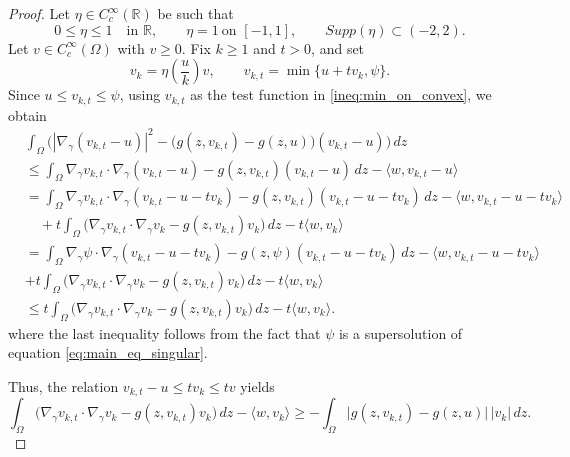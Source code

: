 \documentclass[11pt]{article}
\newcommand{\gradgr}{\nabla_{\gamma}}
\begin{document}
\begin{proof}
Let $\eta \in C_c^\infty(\mathbb{R})$ be such that
\begin{equation*}
0 \le \eta \le 1 \quad \text{in } \mathbb{R}, \qquad
\eta = 1 \ \text{on } [-1,1], \qquad
Supp(\eta) \subset (-2,2).
\end{equation*}
Let $v \in C_c^\infty(\Omega)$ with $v \ge 0$. Fix $k \ge 1$ and $t > 0$, and set
\begin{equation*}
v_k = \eta\!\left( \frac{u}{k} \right) v,
\qquad
v_{k,t} = \min \{ u + t v_k , \psi \}.
\end{equation*}
Since $u \le v_{k,t} \le \psi$, using $v_{k,t}$ as the test function in \eqref{ineq:min_on_convex}, we obtain
\begin{align*}
&\int_\Omega
\Big(
|\gradgr (v_{k,t}-u)|^2
-
\big( g(z,v_{k,t}) - g(z,u) \big)
(v_{k,t}-u)
\Big)\,dz
 \\ &
\le
\int_\Omega
\gradgr v_{k,t} \cdot \gradgr (v_{k,t}-u)
-
g(z,v_{k,t})(v_{k,t}-u)\,dz
-
\langle w , v_{k,t}-u \rangle
\\ & =
\int_\Omega
\gradgr v_{k,t} \cdot \gradgr (v_{k,t}-u-t v_k)
-
g(z,v_{k,t})(v_{k,t}-u-t v_k)\,dz
-
\langle w , v_{k,t}-u-t v_k \rangle
\\
&\quad
+ t \int_\Omega
\big(
\gradgr v_{k,t} \cdot \gradgr v_k
-
g(z,v_{k,t}) v_k
\big)\,dz
-
t \langle w , v_k \rangle \\
& =
\int_\Omega
\gradgr \psi \cdot \gradgr (v_{k,t}-u-t v_k)
-
g(z,\psi)(v_{k,t}-u-t v_k)\,dz
-
\langle w , v_{k,t}-u-t v_k \rangle
\\
&+ t \int_\Omega
\big(
\gradgr v_{k,t} \cdot \gradgr v_k
-
g(z,v_{k,t}) v_k
\big)\,dz
-
t \langle w , v_k \rangle 
\\& \leq 
t \int_\Omega
\big(
\gradgr v_{k,t} \cdot \gradgr v_k
-
g(z,v_{k,t}) v_k
\big)\,dz
-
t \langle w , v_k \rangle.
\end{align*}
where the last inequality follows from the fact that $\psi$ is a supersolution of equation \eqref{eq:main_eq_singular}.

Thus, the relation $v_{k,t} - u \le t v_k \le t v$ yields
\begin{equation*}
\int_\Omega
\big(
\gradgr v_{k,t} \cdot \gradgr v_k
-
g(z,v_{k,t}) v_k
\big)\,dz
-
\langle w , v_k \rangle
\ge
-
\int_\Omega
\big| g(z,v_{k,t}) - g(z,u) \big|\, |v_k|\, dz .
\end{equation*}


\end{proof}
\end{document}
